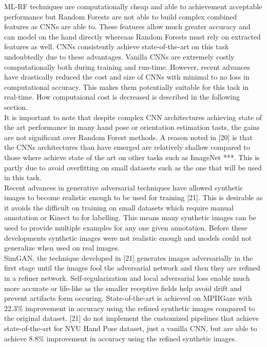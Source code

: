 \documentclass{article}
\begin{document}
ML-RF techniques are computationally cheap and able to achievement acceptable performance but Random Forests are not able to build complex combined features as CNNs are able to. These features allow much greater accuracy and can model on the hand directly whereaas Random Forests must rely on extracted features as well. CNNs consistently achieve state-of-the-art on this task undoubtedly due to these advantages. Vanilla CNNs are extremely costly computationally both during training and run-time. However, recent advances have drastically reduced the cost and size of CNNs with minimal to no loss in computational accuracy. This makes them potentially suitable for this task in real-time. How computaional cost is decreased is described in the following section. \\

It is important to note that despite complex CNN architectures achieving state of the art performance in many hand pose or orientation estimation tasts, the gains are not significant over Random Forest methods. A reason noted in [20] is that the CNNs architectures than have emerged are relatively shallow compared to those where achieve state of the art on other tasks such as ImageNet ***. This is partly due to avoid overfitting on small datasets such as the one that will be used in this task. \\

Recent advances in generative adversarial techniques have allowed synthetic images to become realistic enough to be used for training [21]. This is desirable as it avoids the difficult on training on small datasets which require manual annotation or  Kinect to for labelling. This means many synthetic images can be used to provide multiple examples for any one given annotation. Before these developments synthetic images were not realistic enough and models could not generalize when used on real images.\\

SimGAN, the technique developed in [21] generates images adversarially in the first stage until the images fool the adversarial network and then they are refined  in a refiner network. Self-regularization and local adversarial loss enable much more accurate or life-like as the smaller receptive fields help avoid drift and prevent artifacts form occuring. State-of-the-art is achieved on MPIIGaze with 22.3\% improvement in accuracy using the refined synthetic images compared to the original dataset. [21] do not implement the customized pipelines that achieve state-of-the-art for NYU Hand Pose dataset, just a vanilla CNN, but are able to achieve 8.8\% improvement in accuracy using the refined synthetic images.\\
\end{document}
